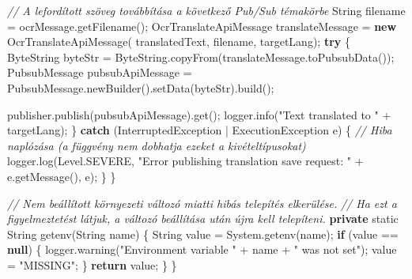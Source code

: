 \documentclass[
]{article}
\newenvironment{Shaded}{}{}
\newcommand{\BuiltInTok}[1]{\textcolor[rgb]{0.00,0.50,0.00}{#1}}
\newcommand{\CommentTok}[1]{\textcolor[rgb]{0.38,0.63,0.69}{\textit{#1}}}
\newcommand{\ControlFlowTok}[1]{\textcolor[rgb]{0.00,0.44,0.13}{\textbf{#1}}}
\newcommand{\DataTypeTok}[1]{\textcolor[rgb]{0.56,0.13,0.00}{#1}}
\newcommand{\FunctionTok}[1]{\textcolor[rgb]{0.02,0.16,0.49}{#1}}
\newcommand{\KeywordTok}[1]{\textcolor[rgb]{0.00,0.44,0.13}{\textbf{#1}}}
\newcommand{\NormalTok}[1]{#1}
\newcommand{\OperatorTok}[1]{\textcolor[rgb]{0.40,0.40,0.40}{#1}}
\newcommand{\StringTok}[1]{\textcolor[rgb]{0.25,0.44,0.63}{#1}}
\begin{document}
\begin{Shaded}
\begin{Highlighting}[]
    \CommentTok{// A lefordított szöveg továbbítása a következő Pub/Sub témakörbe}
    \BuiltInTok{String}\NormalTok{ filename }\OperatorTok{=}\NormalTok{ ocrMessage}\OperatorTok{.}\FunctionTok{getFilename}\OperatorTok{();}
\NormalTok{    OcrTranslateApiMessage translateMessage }\OperatorTok{=} \KeywordTok{new} \FunctionTok{OcrTranslateApiMessage}\OperatorTok{(}
\NormalTok{        translatedText}\OperatorTok{,}\NormalTok{ filename}\OperatorTok{,}\NormalTok{ targetLang}\OperatorTok{);}
    \ControlFlowTok{try} \OperatorTok{\{}
\NormalTok{      ByteString byteStr }\OperatorTok{=}\NormalTok{ ByteString}\OperatorTok{.}\FunctionTok{copyFrom}\OperatorTok{(}\NormalTok{translateMessage}\OperatorTok{.}\FunctionTok{toPubsubData}\OperatorTok{());}
\NormalTok{      PubsubMessage pubsubApiMessage }\OperatorTok{=}\NormalTok{ PubsubMessage}\OperatorTok{.}\FunctionTok{newBuilder}\OperatorTok{().}\FunctionTok{setData}\OperatorTok{(}\NormalTok{byteStr}\OperatorTok{).}\FunctionTok{build}\OperatorTok{();}

\NormalTok{      publisher}\OperatorTok{.}\FunctionTok{publish}\OperatorTok{(}\NormalTok{pubsubApiMessage}\OperatorTok{).}\FunctionTok{get}\OperatorTok{();}
\NormalTok{      logger}\OperatorTok{.}\FunctionTok{info}\OperatorTok{(}\StringTok{"Text translated to "} \OperatorTok{+}\NormalTok{ targetLang}\OperatorTok{);}
    \OperatorTok{\}} \ControlFlowTok{catch} \OperatorTok{(}\BuiltInTok{InterruptedException} \OperatorTok{|} \BuiltInTok{ExecutionException}\NormalTok{ e}\OperatorTok{)} \OperatorTok{\{}
      \CommentTok{// Hiba naplózása (a függvény nem dobhatja ezeket a kivételtípusokat)}
\NormalTok{      logger}\OperatorTok{.}\FunctionTok{log}\OperatorTok{(}\BuiltInTok{Level}\OperatorTok{.}\FunctionTok{SEVERE}\OperatorTok{,} \StringTok{"Error publishing translation save request: "} \OperatorTok{+}\NormalTok{ e}\OperatorTok{.}\FunctionTok{getMessage}\OperatorTok{(),}\NormalTok{ e}\OperatorTok{);}
    \OperatorTok{\}}
  \OperatorTok{\}}

  \CommentTok{// Nem beállított környezeti változó miatti hibás telepítés elkerülése.}
  \CommentTok{// Ha ezt a figyelmeztetést látjuk, a változó beállítása után újra kell telepíteni.}
  \KeywordTok{private} \DataTypeTok{static} \BuiltInTok{String} \FunctionTok{getenv}\OperatorTok{(}\BuiltInTok{String}\NormalTok{ name}\OperatorTok{)} \OperatorTok{\{}
    \BuiltInTok{String}\NormalTok{ value }\OperatorTok{=} \BuiltInTok{System}\OperatorTok{.}\FunctionTok{getenv}\OperatorTok{(}\NormalTok{name}\OperatorTok{);}
    \ControlFlowTok{if} \OperatorTok{(}\NormalTok{value }\OperatorTok{==} \KeywordTok{null}\OperatorTok{)} \OperatorTok{\{}
\NormalTok{      logger}\OperatorTok{.}\FunctionTok{warning}\OperatorTok{(}\StringTok{"Environment variable "} \OperatorTok{+}\NormalTok{ name }\OperatorTok{+} \StringTok{" was not set"}\OperatorTok{);}
\NormalTok{      value }\OperatorTok{=} \StringTok{"MISSING"}\OperatorTok{;}
    \OperatorTok{\}}
    \ControlFlowTok{return}\NormalTok{ value}\OperatorTok{;}
  \OperatorTok{\}}
\OperatorTok{\}}
\end{Highlighting}
\end{Shaded}
\end{document}
